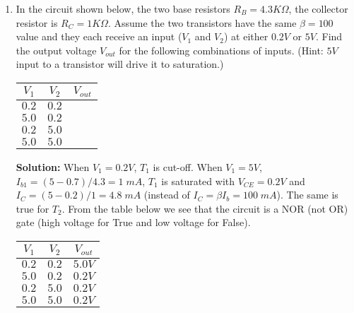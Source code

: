 \begin{enumerate}

{\bf Solution:}
 \begin{itemize}
 \item 
 \[ i_c(t)=\beta i_b(t)=(5+3\cos \omega t)\;mA \]
 \[ v_c(t)=V_{cc}-R_c i_c(t)=20-2000 (5+3\cos \omega t)\times 10^{-3}
    =10-6\cos \omega t  \]
 \item
 \[ i_c(t)=\beta i_b(t)=(1+3\cos \omega t)\;mA \]
 \[ v_c(t)=V_{cc}-R_c i_c(t)=20-2000 (9+3\cos \omega t)\times 10^{-3}
    =2-6\cos \omega t  \]
 Clipping happens during the negative half-cycle due to saturation.
 \item
 \[ i_c(t)=\beta i_b(t)=(10+3\cos \omega t)\;mA \]
 \[ v_c(t)=V_{cc}-R_c i_c(t)=20-2000 (1+3\cos \omega t)\times 10^{-3}
    =18-6\cos \omega t  \]
 Clipping happens during the positive half-cycle due to cut-off.
 \end{itemize}


\item In the circuit shown below, the two base resistors $R_B=4.3K\Omega$,
the collector resistor is $R_C=1K\Omega$. Assume the two transistors
have the same $\beta=100$ value and they each receive an input ($V_1$ and
$V_2$) at either $0.2V$ or $5V$. Find the output voltage $V_{out}$ for
the following combinations of inputs. (Hint: $5V$ input to a transistor
will drive it to saturation.)

\begin{tabular}{cc|c}\hline
$V_1$ & $V_2$ & $V_{out}$ \\ \hline
  $0.2$ & $0.2$ &         \\
  $5.0$ & $0.2$ &         \\
  $0.2$ & $5.0$ &         \\
  $5.0$ & $5.0$ &         \hline
\end{tabular}


{\bf Solution:} When $V_1=0.2V$, $T_1$ is cut-off. When $V_1=5V$, 
$I_{b1}=(5-0.7)/4.3=1\;mA$, $T_1$ is saturated with $V_{CE}=0.2V$
and $I_C=(5-0.2)/1=4.8\;mA$ (instead of $I_C=\beta I_b=100\;mA$).
The same is true for $T_2$. From the table below we see that the
circuit is a NOR (not OR) gate (high voltage for True and low
voltage for False). 

\begin{tabular}{cc|c}\hline
$V_1$ & $V_2$ & $V_{out}$ \\ \hline
  $0.2$ & $0.2$ & $5.0V$ \\
  $5.0$ & $0.2$ & $0.2V$ \\
  $0.2$ & $5.0$ & $0.2V$ \\
  $5.0$ & $5.0$ & $0.2V$ \hline
\end{tabular}


\end{enumerate}



